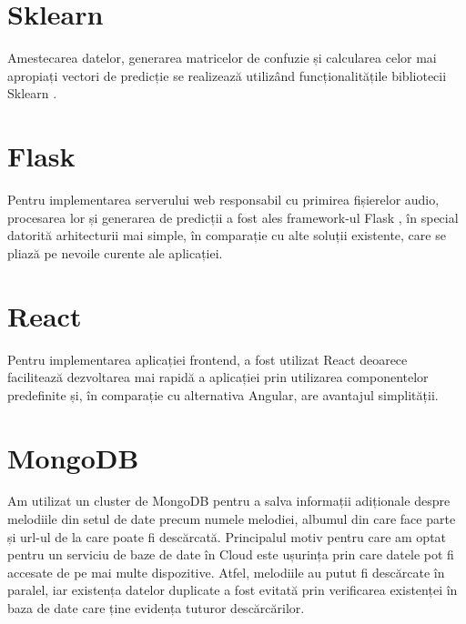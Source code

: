 \section{Sklearn}
Amestecarea datelor, generarea matricelor de confuzie și calcularea celor mai apropiați vectori de predicție se realizează
 utilizând funcționalitățile bibliotecii Sklearn \cite{sklearn}. 
\section{Flask}
Pentru implementarea serverului web responsabil cu primirea fișierelor audio, procesarea lor și generarea de predicții a fost ales framework-ul Flask \cite{flask}, în special datorită 
arhitecturii mai simple, în comparație cu alte soluții existente, care se pliază pe nevoile curente ale aplicației.
\section{React}
Pentru implementarea aplicației frontend, a fost utilizat React \cite{react} deoarece facilitează dezvoltarea mai rapidă a aplicației prin utilizarea componentelor 
predefinite și, în comparație cu alternativa Angular, are avantajul simplității.
\section{MongoDB}
Am utilizat un cluster de MongoDB \cite{mongo} pentru a salva informații adiționale despre melodiile din setul de date precum numele melodiei, albumul 
din care face parte și url-ul de la care poate fi descărcată. Principalul motiv pentru care am optat pentru un serviciu de baze de date în
Cloud este ușurința prin care datele pot fi accesate de pe mai multe dispozitive. Atfel, melodiile au putut fi descărcate în paralel, iar
existența datelor duplicate a fost evitată prin verificarea existenței în baza de date care ține evidența tuturor descărcărilor.